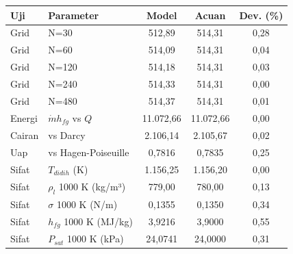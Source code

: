 \documentclass[
  indonesian,
  12pt,
  a4paper,
]{report}
\newcounter{none} %
\begin{document}
{\def\LTcaptype{none} %
\begin{longtable}[]{@{}llccc@{}}
\toprule\noalign{}
Uji & Parameter & Model & Acuan & Dev. (\%) \\
\midrule\noalign{}
\endhead
\bottomrule\noalign{}
\endlastfoot
Grid & N=30 & 512,89 & 514,31 & 0,28 \\
Grid & N=60 & 514,09 & 514,31 & 0,04 \\
Grid & N=120 & 514,18 & 514,31 & 0,03 \\
Grid & N=240 & 514,33 & 514,31 & 0,00 \\
Grid & N=480 & 514,37 & 514,31 & 0,01 \\
Energi & \(\dot m h_{fg}\) vs \(Q\) & 11.072,66 & 11.072,66 & 0,00 \\
Cairan & vs Darcy & 2.106,14 & 2.105,67 & 0,02 \\
Uap & vs Hagen-Poiseuille & 0,7816 & 0,7835 & 0,25 \\
Sifat & \(T_{didih}\) (K) & 1.156,25 & 1.156,20 & 0,00 \\
Sifat & \(\rho_l\) 1000 K (kg/m³) & 779,00 & 780,00 & 0,13 \\
Sifat & \(\sigma\) 1000 K (N/m) & 0,1355 & 0,1350 & 0,34 \\
Sifat & \(h_{fg}\) 1000 K (MJ/kg) & 3,9216 & 3,9000 & 0,55 \\
Sifat & \(P_{sat}\) 1000 K (kPa) & 24,0741 & 24,0000 & 0,31 \\
\end{longtable}
}
\end{document}
